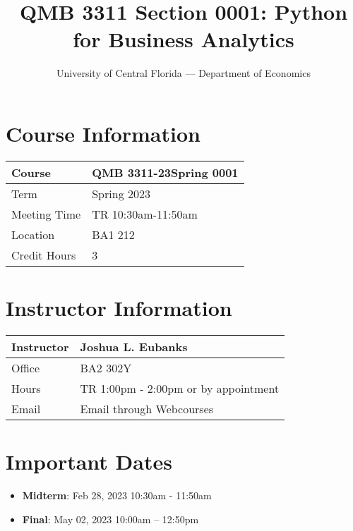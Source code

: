 \documentclass[11pt]{paper}
\begin{document}
\title{QMB 3311 Section 0001: Python for Business Analytics}
\author{University of Central Florida --- Department of Economics}

\maketitle
\hrulefill

\section*{Course Information}
\begin{flushleft}
\begin{tabular}{| l | l |}\hline
 Course & QMB 3311-23Spring 0001 \\\hline
 Term & Spring 2023 \\\hline
 Meeting Time & TR 10:30am-11:50am\\\hline
 Location & BA1 212\\\hline
 Credit Hours & 3 \\\hline
\end{tabular}
\end{flushleft}


\section*{Instructor Information}
\begin{flushleft}
\begin{tabular}{| l | l |}\hline
 Instructor & Joshua L. Eubanks \\\hline
 Office & BA2 302Y \\\hline
 Hours & TR 1:00pm - 2:00pm or by appointment \\\hline
 Email & Email through Webcourses \\\hline
\end{tabular}
\end{flushleft}

\section*{Important Dates}

\begin{itemize}
  \item \textbf{Midterm}: Feb 28, 2023 10:30am - 11:50am
  \item \textbf{Final}: May 02, 2023 10:00am – 12:50pm
\end{itemize}
\end{document}
